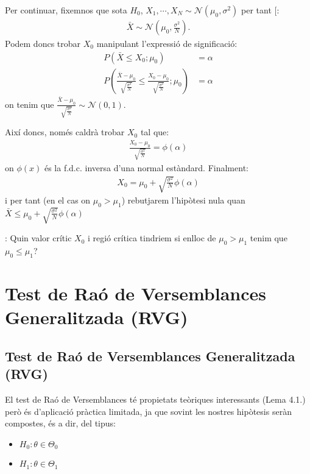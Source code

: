 \documentclass[letterpaper,10pt,english]{sphinxmanual}
\begin{document}
Per continuar, fixem\sphinxhyphen{}nos que sota
\(H_0\), \(X_1, \cdots, X_N \sim \mathcal{N}(\mu_0, \sigma^2)\) per tant
{[}\sphinxhref{https://atibaup.github.io/ModInfer\_2020/slides/0\_Intro/0\_2\_Intro\_stats.html\#29}{Diapo 29, Tema 2}{]}:
\begin{equation*}
\begin{split}\bar{X} \sim \mathcal{N}(\mu_0, \frac{\sigma^2}{N}).\end{split}
\end{equation*}
Podem doncs trobar \(X_0\) manipulant l’expressió de significació:
\begin{equation*}
\begin{split}P(\bar{X} \leq X_0; \mu_0) &= \alpha \\
P(\frac{\bar{X} - \mu_0}{\sqrt{\frac{\sigma^2}{N}}} \leq \frac{X_0 - \mu_0}{\sqrt{\frac{\sigma^2}{N}}}; \mu_0) &= \alpha\end{split}
\end{equation*}
on tenim que \(\frac{\bar{X} - \mu_0}{\sqrt{\frac{\sigma^2}{N}}} \sim \mathcal{N}(0, 1)\).

Així doncs, només caldrà trobar \(X_0\) tal que:
\begin{equation*}
\begin{split}\frac{X_0 - \mu_0}{\sqrt{\frac{\sigma^2}{N}}} = \phi\left(\alpha\right)\end{split}
\end{equation*}
on \(\phi(x)\) és la f.d.c. inversa d’una normal estàndard. Finalment:
\begin{equation*}
\begin{split}X_0 = \mu_0 + \sqrt{\frac{\sigma^2}{N}}\phi\left(\alpha\right)\end{split}
\end{equation*}
i per tant (en el cas on \(\mu_0 > \mu_1\)) rebutjarem
l’hipòtesi nula quan \(\bar{X} \leq \mu_0 + \sqrt{\frac{\sigma^2}{N}}\phi\left(\alpha\right)\)

: Quin valor crític \(X_0\) i regió crítica tindriem si
enlloc de \(\mu_0 > \mu_1\) tenim que \(\mu_0 \leq \mu_1\)?


\section{Test de Raó de Versemblances Generalitzada (RVG)}
\label{\detokenize{0_Intro/0_4_Tests:test-de-rao-de-versemblances-generalitzada-rvg}}

\subsection{Test de Raó de Versemblances Generalitzada (RVG)}
\label{\detokenize{0_Intro/0_4_Tests:id1}}
El test de Raó de Versemblances té propietats teòriques interessants (Lema 4.1.)
però és d’aplicació pràctica limitada, ja que sovint les nostres
hipòtesis seràn compostes, és a dir, del tipus:
\begin{itemize}
\item {} 
\(H_0: \theta \in \Theta_0\)

\item {} 
\(H_1: \theta \in \Theta_1\)

\end{itemize}
\end{document}
